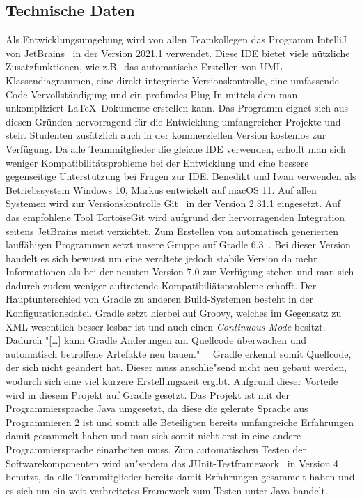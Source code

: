 \newpage

\subsection{Technische Daten}\label{subsec:technische-daten}
Als Entwicklungsumgebung wird von allen Teamkollegen das Programm IntelliJ von JetBrains~\cite[]{intellij} in der Version 2021.1 verwendet.
Diese IDE bietet viele n\"utzliche Zusatzfunktionen, wie z.B.\ das automatische Erstellen von UML-Klassendiagrammen, eine direkt integrierte Versionskontrolle, eine umfassende Code-Vervollst\"andigung und ein profundes Plug-In mittels dem man unkompliziert \LaTeX\ Dokumente erstellen kann.
Das Programm eignet sich aus diesen Gr\"unden hervorragend f\"ur die Entwicklung umfangreicher Projekte und steht Studenten zus\"atzlich auch in der kommerziellen Version kostenlos zur Verf\"ugung.
Da alle Teammitglieder die gleiche IDE verwenden, erhofft man sich weniger Kompatibilit\"atsprobleme bei der Entwicklung und eine bessere gegenseitige Unterst\"utzung bei Fragen zur IDE.
Benedikt und Iwan verwenden als Betriebssystem Windows 10, Markus entwickelt auf macOS 11.
Auf allen Systemen wird zur Versionskontrolle Git~\cite{git} in der Version 2.31.1 eingesetzt.
Auf das empfohlene Tool TortoiseGit wird aufgrund der hervorragenden Integration seitens JetBrains meist verzichtet.
Zum Erstellen von automatisch generierten lauff\"ahigen Programmen setzt unsere Gruppe auf Gradle 6.3~\cite{gradle}.
Bei dieser Version handelt es sich bewusst um eine veraltete jedoch stabile Version da mehr Informationen als bei der neusten Version 7.0 zur Verf\"ugung stehen und man sich dadurch zudem weniger auftretende Kompatibili\"atsprobleme erhofft.
Der Hauptunterschied von Gradle zu anderen Build-Systemen besteht in der Konfigurationsdatei.
Gradle setzt hierbei auf Groovy, welches im Gegensatz zu XML wesentlich besser lesbar ist und auch einen \emph{Continuous Mode} besitzt.
Dadurch "[\ldots] kann Gradle \"Anderungen am Quellcode \"uberwachen und automatisch betroffene Artefakte neu bauen."~\cite[S. 219 ff.]{besserCoden:gradle}
\ Gradle erkennt somit Quellcode, der sich nicht ge\"andert hat.
Dieser muss anschlie"send nicht neu gebaut werden, wodurch sich eine viel k\"urzere Erstellungszeit ergibt.
Aufgrund dieser Vorteile wird in diesem Projekt auf Gradle gesetzt.
Das Projekt ist mit der Programmiersprache Java umgesetzt, da diese die gelernte Sprache aus Programmieren 2 ist und somit alle Beteiligten bereits umfangreiche Erfahrungen damit gesammelt haben und man sich somit nicht erst in eine andere Programmiersprache einarbeiten muss.
Zum automatischen Testen der Softwarekomponenten wird au"serdem das JUnit-Testframework~\cite{junit} in Version 4 benutzt, da alle Teammitglieder bereits damit Erfahrungen gesammelt haben und es sich um ein weit verbreitetes Framework zum Testen unter Java handelt.

